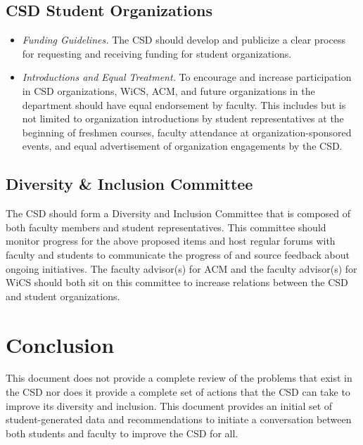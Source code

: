 \documentclass{article}
\begin{document}
\subsection{CSD Student Organizations}
\begin{itemize}
\item
\emph{Funding Guidelines.}
The CSD should develop and publicize a clear process for requesting and receiving funding for student organizations.
\item
\emph{Introductions and Equal Treatment.}
To encourage and increase participation in CSD organizations, WiCS, ACM, and future organizations in 
the department should have equal endorsement by faculty. This includes but is not limited to organization introductions by student
representatives at the beginning of freshmen courses, faculty attendance at organization-sponsored events, and equal 
advertisement of organization engagements by the CSD. 
\end{itemize}

\subsection{Diversity \& Inclusion Committee} 
The CSD should form a Diversity and Inclusion Committee that is composed of both faculty members and 
student representatives. This committee should monitor progress for the above proposed items and host regular forums with 
faculty and students to communicate the progress of and source feedback about ongoing initiatives. The faculty 
advisor(s) for ACM and the faculty advisor(s)
for WiCS should both sit on this committee to increase relations between the CSD and student organizations. 

\section{Conclusion}\label{conclusion}
This document does not provide a complete review of the problems that exist in the CSD nor does 
it provide a complete set of actions that the CSD can take to improve its diversity and inclusion.
This document provides an initial set of student-generated data and recommendations to initiate a conversation 
between both students and faculty to improve the CSD for all.
\end{document}
